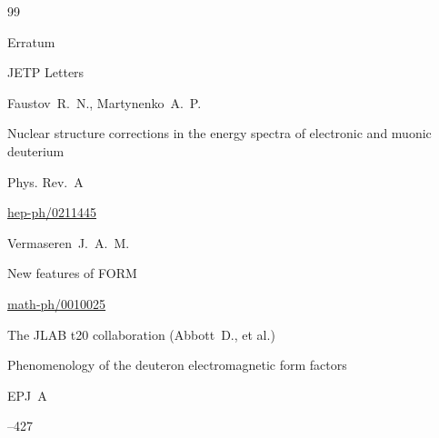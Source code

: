 \begin{thebibliography}{99}
\moreref

\paper Erratum

\jour JETP Letters











\by Faustov~R.~N., Martynenko~A.~P.

\paper Nuclear structure corrections in the energy spectra of electronic and muonic deuterium

\jour Phys. Rev.~A






\arxiv \href{http://arxiv.org/abs/hep-ph/0211445}{hep-ph/0211445}




\by Vermaseren~J.~A.~M.

\preprint New features of FORM

\arxiv \href{http://arxiv.org/abs/math-ph/0010025}{math-ph/0010025}






\by The JLAB t20 collaboration (Abbott~D., et al.)

\paper Phenomenology of the deuteron electromagnetic form factors 

\jour EPJ~A




--427



\end{thebibliography}

